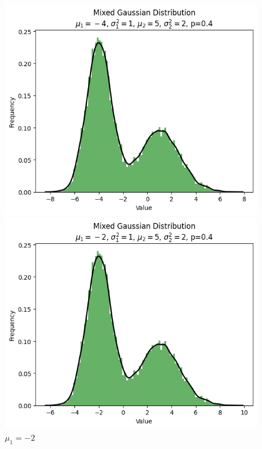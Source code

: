 \documentclass{article}
\begin{document}
\begin{figure}[H]
    \centering
    \begin{minipage}[b]{0.3\linewidth}
        \centering
        \includegraphics[width=\linewidth]{figure/mu_1=-4.png}
        \caption{$\mu_1=-4$}
    \end{minipage}
    \hfill
    \begin{minipage}[b]{0.3\linewidth}
        \centering
        \includegraphics[width=\linewidth]{figure/mu_1=-2.png}
        \caption{$\mu_1=-2$}
    \end{minipage}

\end{figure}
\end{document}
